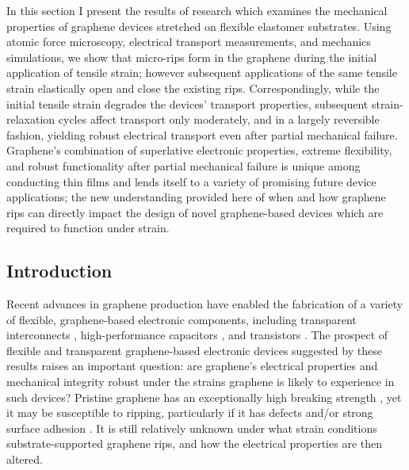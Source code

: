 \documentclass[edeposit,fullpage,draftthesis]{uiucthesis2009}
\begin{document}
    In this section I present the results of research which examines
    the mechanical properties of graphene devices stretched on flexible
    elastomer substrates. Using atomic force microscopy, electrical transport
    measurements, and mechanics simulations, we show that micro-rips form in the
    graphene during the initial application of tensile strain; however subsequent
    applications of the same tensile strain elastically open and close the existing
    rips. Correspondingly, while the initial tensile strain degrades the devices'
    transport properties, subsequent strain-relaxation cycles affect transport only
    moderately, and in a largely reversible fashion, yielding robust electrical
    transport even after partial mechanical failure. Graphene's combination of
    superlative electronic properties, extreme flexibility, and robust
    functionality after partial mechanical failure is unique among conducting thin
    films and lends itself to a variety of promising future device applications;
    the new understanding provided here of when and how graphene rips can directly
    impact the design of novel graphene-based devices which are required to
    function under strain.
    
    \subsection{Introduction}
    
        Recent advances in graphene production \cite{Kim2009, Bae2010, Lee2010} have
        enabled the fabrication of a variety of flexible, graphene-based electronic
        components, including transparent interconnects \cite{Kim2011}, high-performance
        capacitors \cite{El-Kady2012}, and transistors \cite{Lee2011}. The prospect of
        flexible and transparent graphene-based electronic devices suggested by these
        results raises an important question: are graphene's electrical properties and
        mechanical integrity robust under the strains graphene is likely to experience
        in such devices? Pristine graphene has an exceptionally high breaking
        strength \cite{Lee2008}, yet it may be susceptible to ripping, particularly if
        it has defects \cite{Kim2012} and/or strong  surface adhesion \cite{Sen2010}. It
        is still relatively unknown under what strain conditions substrate-supported
        graphene rips, and how the electrical properties are then altered.
        
\end{document}
